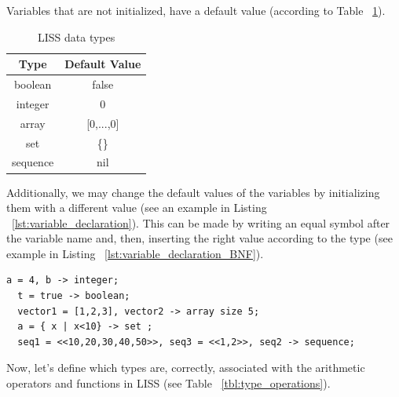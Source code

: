\documentclass[
  oneside,
  11pt, a4paper,
  footinclude=true,
  headinclude=true,
  cleardoublepage=empty
]{scrbook}
\begin{document}
Variables that are not initialized, have a default value (according to Table ~\ref{tbl:data_types}).

\begin{table}[]
\centering
\caption{LISS data types}
\label{tbl:data_types}
\begin{tabular}{|c|c|}
\hline
\textbf{Type}       & \multicolumn{1}{l|}{\textbf{Default Value}} \\ \hline
boolean             & false                                       \\ \hline
integer             & 0                                           \\ \hline
array               & {[}0,...,0{]}                               \\ \hline
set                 & \{\}                                        \\ \hline
sequence            & nil                                         \\ \hline
\end{tabular}
\end{table}

\newpage
Additionally, we may change the default values of the variables by initializing them with a different value (see an example in Listing ~\ref{lst:variable_declaration}).
This can be made by writing an equal symbol after the variable name and, then, inserting the right value according to the type (see example in Listing ~\ref{lst:variable_declaration_BNF}).

\begin{lstlisting}[caption={Initialize a variable},label={lst:variable_declaration}]
  a = 4, b -> integer;
  t = true -> boolean;
  vector1 = [1,2,3], vector2 -> array size 5;
  a = { x | x<10} -> set ;
  seq1 = <<10,20,30,40,50>>, seq3 = <<1,2>>, seq2 -> sequence;
\end{lstlisting}

Now, let's define which types are, correctly, associated with the arithmetic operators and functions in LISS (see Table ~\ref{tbl:type_operations}).
\end{document}
